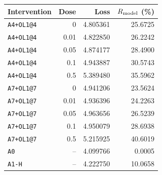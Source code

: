 \begin{tabular}{lrrr}
\toprule
Intervention & Dose & Loss & $R_{\mathrm{model}}$ (\%) \\
\midrule
\texttt{A4+OL1@4} & 0 & 4.805361 & 25.6725 \\
\texttt{A4+OL1@4} & 0.01 & 4.822850 & 26.2242 \\
\texttt{A4+OL1@4} & 0.05 & 4.874177 & 28.4900 \\
\texttt{A4+OL1@4} & 0.1 & 4.943887 & 30.5743 \\
\texttt{A4+OL1@4} & 0.5 & 5.389480 & 35.5962 \\
\texttt{A7+OL1@7} & 0 & 4.941206 & 23.5624 \\
\texttt{A7+OL1@7} & 0.01 & 4.936396 & 24.2263 \\
\texttt{A7+OL1@7} & 0.05 & 4.963656 & 26.5239 \\
\texttt{A7+OL1@7} & 0.1 & 4.950079 & 28.6938 \\
\texttt{A7+OL1@7} & 0.5 & 5.215925 & 40.6019 \\
\texttt{A0} & -- & 4.099766 & 0.0005 \\
\texttt{A1-H} & -- & 4.222750 & 10.0658 \\
\bottomrule
\end{tabular}
